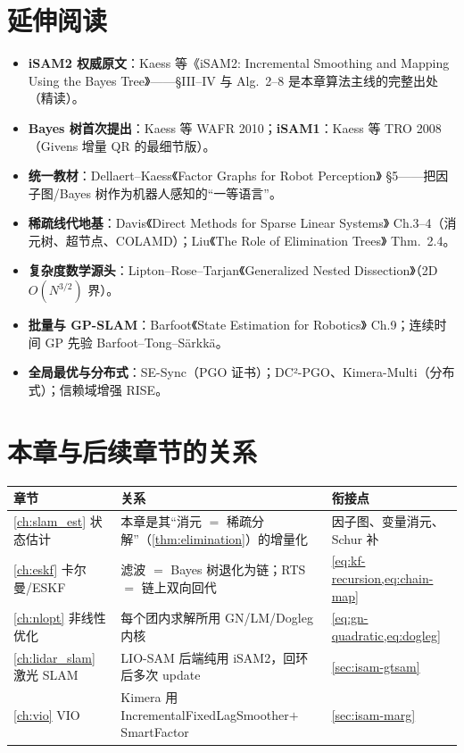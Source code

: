 \section*{延伸阅读}
\begin{itemize}
  \item \textbf{iSAM2 权威原文}：Kaess 等《iSAM2: Incremental Smoothing and Mapping Using the Bayes Tree》\cite{kaess2012isam2}——§III--IV 与 Alg.~2--8 是本章算法主线的完整出处（精读）。
  \item \textbf{Bayes 树首次提出}：Kaess 等 WAFR 2010\cite{kaess2010bayestree}；\textbf{iSAM1}：Kaess 等 TRO 2008\cite{kaess2008isam}（Givens 增量 QR 的最细节版）。
  \item \textbf{统一教材}：Dellaert--Kaess《Factor Graphs for Robot Perception》\cite{dellaert2017factor} §5——把因子图/Bayes 树作为机器人感知的“一等语言”。
  \item \textbf{稀疏线代地基}：Davis《Direct Methods for Sparse Linear Systems》\cite{davis2006direct} Ch.3--4（消元树、超节点、COLAMD）；Liu《The Role of Elimination Trees》\cite{liu1990elimination} Thm.~2.4。
  \item \textbf{复杂度数学源头}：Lipton--Rose--Tarjan《Generalized Nested Dissection》\cite{lipton1979generalized}（2D $O(N^{3/2})$ 界）。
  \item \textbf{批量与 GP-SLAM}：Barfoot《State Estimation for Robotics》\cite{barfoot2024state} Ch.9；连续时间 GP 先验 Barfoot--Tong--Särkkä\cite{barfoot2014batch}。
  \item \textbf{全局最优与分布式}：SE-Sync\cite{rosen2019sesync}（PGO 证书）；DC²-PGO\cite{tian2021distributed}、Kimera-Multi\cite{tian2022kimeramulti}（分布式）；信赖域增强 RISE\cite{rosen2014rise}。
\end{itemize}

\section*{本章与后续章节的关系}
\begin{table}[H]\centering\small
\begin{tabular}{lll}
\toprule
章节 & 关系 & 衔接点 \\
\midrule
\cref{ch:slam_est} 状态估计 & 本章是其“消元 $=$ 稀疏分解”（\cref{thm:elimination}）的增量化 & 因子图、变量消元、Schur 补 \\
\cref{ch:eskf} 卡尔曼/ESKF & 滤波 $=$ Bayes 树退化为链；RTS $=$ 链上双向回代 & \cref{eq:kf-recursion,eq:chain-map} \\
\cref{ch:nlopt} 非线性优化 & 每个团内求解所用 GN/LM/Dogleg 内核 & \cref{eq:gn-quadratic,eq:dogleg} \\
\cref{ch:lidar_slam} 激光 SLAM & LIO-SAM 后端纯用 iSAM2，回环后多次 update & \cref{sec:isam-gtsam} \\
\cref{ch:vio} VIO & Kimera 用 IncrementalFixedLagSmoother$+$SmartFactor & \cref{sec:isam-marg} \\
\bottomrule
\end{tabular}
\end{table}


